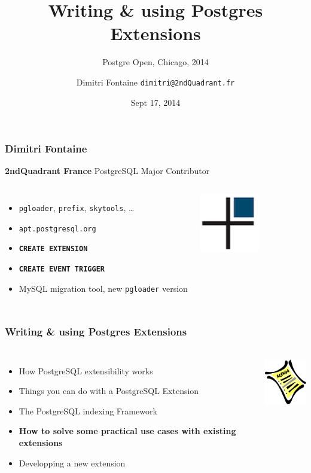 \documentclass{beamer}
\title{Writing \& using Postgres Extensions}
\subtitle{Postgre Open, Chicago, 2014}
\author{Dimitri Fontaine \texttt{dimitri@2ndQuadrant.fr}}
\date{Sept 17, 2014}
\begin{document}
\frame{\titlepage}

\begin{frame}[fragile]
  \frametitle{Dimitri Fontaine}

  \begin{center}
    \textbf{2ndQuadrant France}
    \linebreak
    PostgreSQL Major Contributor
  \end{center}
  \vfill

\begin{columns}[c]

  \begin{itemize}
   \item \texttt{pgloader}, \texttt{prefix}, \texttt{skytools}, …
   \item \texttt{apt.postgresql.org}
   \item \texttt{\textbf{CREATE EXTENSION}}
   \item \texttt{\textbf{CREATE EVENT TRIGGER}}
   \item MySQL migration tool, new \texttt{pgloader} version
  \end{itemize}  

\begin{center}
  \includegraphics[height=7em]{2ndQuadrant-cross.png}
\end{center}
\end{columns}
\end{frame}

\begin{frame}[fragile]
  \frametitle{Writing \& using Postgres Extensions}

  \vfill

\begin{columns}

  \begin{itemize}
  \item How PostgreSQL extensibility works
  \item Things you can do with a PostgreSQL Extension
  \item The PostgreSQL indexing Framework
  \item \textbf{How to solve some practical use cases with existing extensions}
  \item Developping a new extension
  \end{itemize}

\begin{center}
  \includegraphics[height=6em]{agenda.jpg}
\end{center}
\end{columns}
\end{frame}
\end{document}
